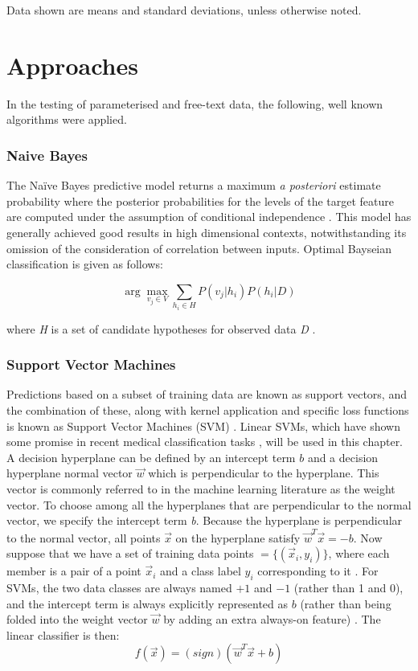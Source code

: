 Data shown are means and standard deviations, unless otherwise noted.

 \section*{Approaches}

In the testing of parameterised and free-text data, the  following, well known algorithms were applied. 


\subsubsection{Naive Bayes}

The Naïve Bayes predictive model returns a  maximum \textit{a posteriori} estimate probability where the posterior probabilities for the levels of the target feature are computed under the assumption of conditional independence \cite{kelleher2015fundamentals}. This model has generally achieved good results in high dimensional contexts, notwithstanding its omission of the consideration of correlation between inputs. Optimal Bayseian classification is given as follows:


\[ \arg \max_{v_{j} \in V} \sum_{h_{i} \in H} P(v_{j}|h_{i}) P(h_{i}|D)\]

where \textit{H} is a set of candidate hypotheses for observed data \textit{D} .


\subsubsection{Support Vector Machines}


Predictions based on a subset of training data are known as support vectors, and the combination of these, along with kernel application and specific loss functions is known as Support Vector Machines (SVM) \cite{murphy2012machine}. Linear SVMs, which have shown some promise in recent medical classification tasks \cite{soguero2014support,sanz2018svm},  will be used in this chapter. A  decision hyperplane can be defined by an intercept term $b$ and a decision hyperplane normal vector $\vec{w}$ which is perpendicular to the hyperplane. This vector is commonly referred to in the machine learning literature as the weight vector. To choose among all the hyperplanes that are perpendicular to the normal vector, we specify the intercept term \textit{b}. Because the hyperplane is perpendicular to the normal vector, all points $\vec{x}$ on the hyperplane satisfy $\vec{w}^{T}\vec{x} = -b$. Now suppose that we have a set of training data points $ = \{(\vec{x}_i,y_i) \}$, where each member is a pair of a point $\vec{x}_i$ and a class label $y_i$ corresponding to it \cite{manning2010introduction}. For SVMs, the two data classes are always named $+1$ and $-1$ (rather than 1 and 0), and the intercept term is always explicitly represented as $b$ (rather than being folded into the weight vector $\vec{w}$ by adding an extra always-on feature) \cite{manning2010introduction}. The linear classifier is then: 
\begin{equation}
f(\vec{x}) = (sign)(\vec{w}^{T}\vec{x} + b)
\end{equation} 

